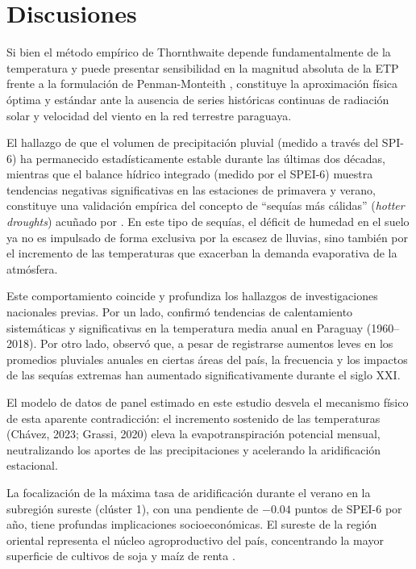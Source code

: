 \documentclass[11pt,a4paper]{article}
\begin{document}
\section{Discusiones}

Si bien el método empírico de Thornthwaite depende fundamentalmente de la temperatura y puede presentar sensibilidad en la magnitud absoluta de la ETP frente a la formulación de Penman-Monteith \citep{allen1998crop}, constituye la aproximación física óptima y estándar ante la ausencia de series históricas continuas de radiación solar y velocidad del viento en la red terrestre paraguaya.

El hallazgo de que el volumen de precipitación pluvial (medido a través del SPI-6) ha permanecido estadísticamente estable durante las últimas dos décadas, mientras que el balance hídrico integrado (medido por el SPEI-6) muestra tendencias negativas significativas en las estaciones de primavera y verano, constituye una validación empírica del concepto de ``sequías más cálidas'' (\textit{hotter droughts}) acuñado por \citet{trenberth_global_2014}. En este tipo de sequías, el déficit de humedad en el suelo ya no es impulsado de forma exclusiva por la escasez de lluvias, sino también por el incremento de las temperaturas que exacerban la demanda evaporativa de la atmósfera.

Este comportamiento coincide y profundiza los hallazgos de investigaciones nacionales previas. Por un lado, \citet{chavez2023} confirmó tendencias de calentamiento sistemáticas y significativas en la temperatura media anual en Paraguay (1960--2018). Por otro lado, \citet{grassi2020} observó que, a pesar de registrarse aumentos leves en los promedios pluviales anuales en ciertas áreas del país, la frecuencia y los impactos de las sequías extremas han aumentado significativamente durante el siglo XXI. 

El modelo de datos de panel estimado en este estudio desvela el mecanismo físico de esta aparente contradicción: el incremento sostenido de las temperaturas (Chávez, 2023; Grassi, 2020) eleva la evapotranspiración potencial mensual, neutralizando los aportes de las precipitaciones y acelerando la aridificación estacional.

La focalización de la máxima tasa de aridificación durante el verano en la subregión sureste (clúster 1), con una pendiente de $-0.04$ puntos de SPEI-6 por año, tiene profundas implicaciones socioeconómicas. El sureste de la región oriental representa el núcleo agroproductivo del país, concentrando la mayor superficie de cultivos de soja y maíz de renta \citep{cepal2014}. 
\end{document}
